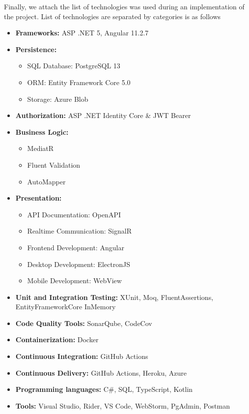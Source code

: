 Finally, we attach the list of technologies was used during an implementation of the project.
List of technologies are separated by categories is as follows
\begin{itemize}
    \item \textbf{Frameworks:} ASP .NET 5, Angular 11.2.7
    \item \textbf{Persistence:}
    \begin{itemize}
        \item SQL Database: PostgreSQL 13
        \item ORM: Entity Framework Core 5.0
        \item Storage: Azure Blob
    \end{itemize}
    \item \textbf{Authorization:} ASP .NET Identity Core \& JWT Bearer
    \item \textbf{Business Logic:}
    \begin{itemize}
        \item MediatR
        \item Fluent Validation
        \item AutoMapper
    \end{itemize}
    \item \textbf{Presentation:}
    \begin{itemize}
        \item API Documentation: OpenAPI
        \item Realtime Communication: SignalR
        \item Frontend Development: Angular
        \item Desktop Development: ElectronJS
        \item Mobile Development: WebView
    \end{itemize}
    \item \textbf{Unit and Integration Testing:} XUnit, Moq, FluentAssertions, EntityFrameworkCore InMemory
    \item \textbf{Code Quality Tools:} SonarQube, CodeCov
    \item \textbf{Containerization:} Docker
    \item \textbf{Continuous Integration:} GitHub Actions
    \item \textbf{Continuous Delivery:} GitHub Actions, Heroku, Azure
    \item \textbf{Programming languages:} C\#, SQL, TypeScript, Kotlin
    \item \textbf{Tools:} Visual Studio, Rider, VS Code, WebStorm, PgAdmin, Postman
\end{itemize}